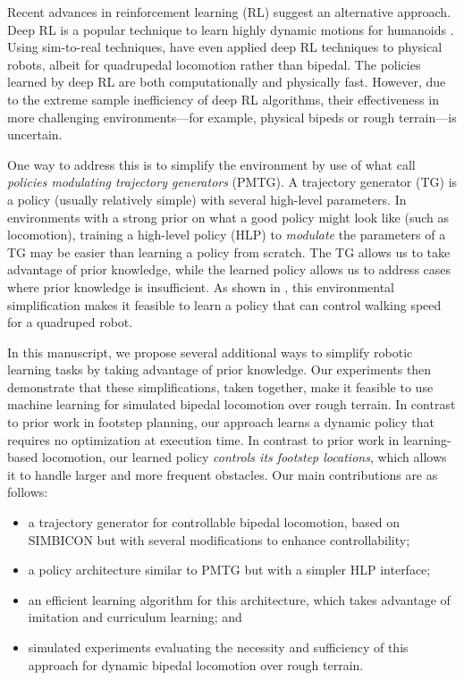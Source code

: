 \documentclass[conference]{IEEEtran}
\begin{document}
Recent advances in reinforcement learning (RL) suggest an alternative approach.
Deep RL is a popular technique to learn highly dynamic motions for humanoids \citep{peng2018deepmimic, heess2017emergence}.
Using sim-to-real techniques, \citet{tan2018sim} have even applied deep RL techniques to physical robots, albeit for quadrupedal locomotion rather than bipedal.
The policies learned by deep RL are both computationally and physically fast.
However, due to the extreme sample inefficiency of deep RL algorithms, their effectiveness in more challenging environments---for example, physical bipeds or rough terrain---is uncertain.

One way to address this is to simplify the environment by use of what \citet{iscen2018pmtg} call \emph{policies modulating trajectory generators} (PMTG).
A trajectory generator (TG) is a policy (usually relatively simple) with several high-level parameters.
In environments with a strong prior on what a good policy might look like (such as locomotion),
training a high-level policy (HLP) to \emph{modulate} the parameters of a TG may be easier than learning a policy from scratch.
The TG allows us to take advantage of prior knowledge, while the learned policy allows us to address cases where prior knowledge is insufficient.
As shown in \citet{iscen2018pmtg}, this environmental simplification makes it feasible to learn a policy that can control walking speed for a quadruped robot.

In this manuscript, we propose several additional ways to simplify robotic learning tasks by taking advantage of prior knowledge.
Our experiments then demonstrate that these simplifications, taken together, make it feasible to use machine learning for simulated bipedal locomotion over rough terrain.
In contrast to prior work in footstep planning, our approach learns a dynamic policy that requires no optimization at execution time.
In contrast to prior work in learning-based locomotion, our learned policy \emph{controls its footstep locations}, which allows it to handle larger and more frequent obstacles.
Our main contributions are as follows:
\begin{itemize}
  \item a trajectory generator for controllable bipedal locomotion, based on SIMBICON \citep{yin2007simbicon} but with several modifications to enhance controllability;
  \item a policy architecture similar to PMTG but with a simpler HLP interface;
  \item an efficient learning algorithm for this architecture, which takes advantage of imitation and curriculum learning; and
  \item simulated experiments evaluating the necessity and sufficiency of this approach for dynamic bipedal locomotion over rough terrain.
\end{itemize}
\end{document}
